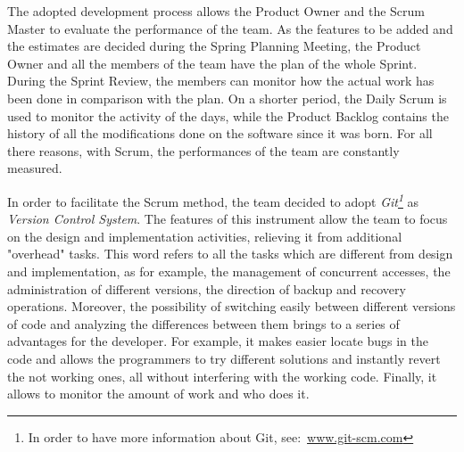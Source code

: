 		The adopted development process allows the Product Owner and the Scrum Master to evaluate the performance of the team. As the features to be added and the estimates are decided during the Spring Planning Meeting, the Product Owner and all the members of the team have the plan of the whole Sprint. During the Sprint Review, the members can monitor how the actual work has been done in comparison with the plan. On a shorter period, the Daily Scrum is used to monitor the activity of the days, while the Product Backlog contains the history of all the modifications done on the software since it was born. For all there reasons, with Scrum, the performances of the team are constantly measured.

		In order to facilitate the Scrum method, the team decided to adopt \emph{Git\footnote{In order to have more information about Git, see:~\url{www.git-scm.com}}} as \emph{Version Control System}. 
		The features of this instrument allow the team to focus on the design and implementation activities, relieving it from additional "overhead" tasks.
		This word refers to all the tasks which are different from design and implementation, as for example, the management of concurrent accesses, the administration of different versions, the direction of backup and recovery operations.
		Moreover, the possibility of switching easily between different versions of code and analyzing the differences between them brings to a series of advantages for the developer.
		For example, it makes easier locate bugs in the code and allows the programmers to try different solutions and instantly revert the not working ones, all without interfering with the working code. 
		Finally, it allows to monitor the amount of work and who does it.

 
			
